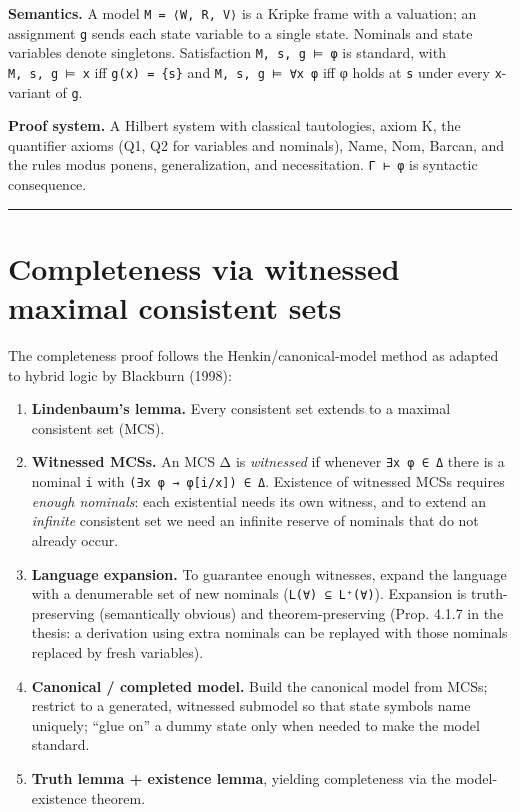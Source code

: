 \documentclass[11pt,a4paper]{article}
\renewcommand{\_}{\origtextunderscore\allowbreak}
\begin{document}
\textbf{Semantics.} A model \texttt{M\ =\ ⟨W,\ R,\ V⟩} is a Kripke frame with a valuation; an assignment \texttt{g} sends each state variable to a single state. Nominals and state variables denote singletons. Satisfaction \texttt{M,\ s,\ g\ ⊨\ φ} is standard, with \texttt{M,\ s,\ g\ ⊨\ x} iff \texttt{g(x)\ =\ \{s\}} and \texttt{M,\ s,\ g\ ⊨\ ∀x\ φ} iff φ holds at \texttt{s} under every \texttt{x}-variant of \texttt{g}.

\textbf{Proof system.} A Hilbert system with classical tautologies, axiom K, the quantifier axioms (Q1, Q2 for variables and nominals), Name, Nom, Barcan, and the rules modus ponens, generalization, and necessitation. \texttt{Γ\ ⊢\ φ} is syntactic consequence.

\begin{center}\rule{0.5\linewidth}{0.5pt}\end{center}

\hypertarget{completeness-via-witnessed-maximal-consistent-sets}{%
\section{Completeness via witnessed maximal consistent sets}\label{completeness-via-witnessed-maximal-consistent-sets}}

The completeness proof follows the Henkin/canonical-model method as adapted to hybrid logic by Blackburn (1998):

\begin{enumerate}
\def\labelenumi{\arabic{enumi}.}
\item
  \textbf{Lindenbaum's lemma.} Every consistent set extends to a maximal consistent set (MCS).
\item
  \textbf{Witnessed MCSs.} An MCS Δ is \emph{witnessed} if whenever \texttt{∃x\ φ\ ∈\ Δ} there is a nominal \texttt{i} with \texttt{(∃x\ φ\ →\ φ{[}i/x{]})\ ∈\ Δ}. Existence of witnessed MCSs requires \emph{enough nominals}: each existential needs its own witness, and to extend an \emph{infinite} consistent set we need an infinite reserve of nominals that do not already occur.
\item
  \textbf{Language expansion.} To guarantee enough witnesses, expand the language with a denumerable set of new nominals (\texttt{L(∀)\ ⊆\ L⁺(∀)}). Expansion is truth-preserving (semantically obvious) and theorem-preserving (Prop. 4.1.7 in the thesis: a derivation using extra nominals can be replayed with those nominals replaced by fresh variables).
\item
  \textbf{Canonical / completed model.} Build the canonical model from MCSs; restrict to a generated, witnessed submodel so that state symbols name uniquely; ``glue on'' a dummy state only when needed to make the model standard.
\item
  \textbf{Truth lemma + existence lemma}, yielding completeness via the model-existence theorem.
\end{enumerate}
\end{document}
